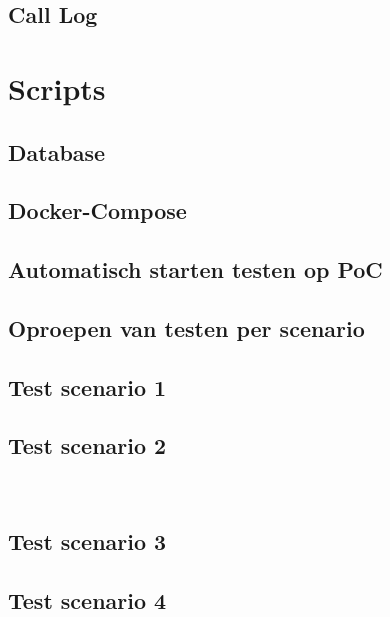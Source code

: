 \section{Call Log}\label{bij_model_calllog}


\chapter{Scripts}\label{bijlage_scripts}
\section{Database}\label{bij_database}


\section{Docker-Compose}\label{bij_docker}


\section{Automatisch starten testen op PoC}\label{bij_start_testing}


\section{Oproepen van testen per scenario}\label{bij_call_testing}


\section{Test scenario 1}\label{bij_scen_1}


\section{Test scenario 2}\label{bij_scen_2}
\\

\section{Test scenario 3}\label{bij_scen_3}


\section{Test scenario 4}\label{bij_scen_4}

